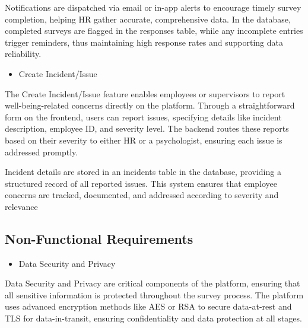 \documentclass[conference]{IEEEtran}
\begin{document}
            Notifications are dispatched via email or in-app 
            alerts to encourage timely survey completion, helping HR gather 
            accurate, comprehensive data. In the database, completed surveys 
            are flagged in the responses table, while any incomplete entries
            trigger reminders, thus maintaining high response rates and 
            supporting data reliability.
            \newline    

            \begin{itemize}
                \item Create Incident/Issue
            \end{itemize}
    
            The Create Incident/Issue feature enables employees or supervisors 
            to report well-being-related concerns directly on the platform. 
            Through a straightforward form on the frontend, users can report 
            issues, specifying details like incident description, employee ID, 
            and severity level. The backend routes these reports based on their 
            severity to either HR or a psychologist, ensuring each issue is 
            addressed promptly. \newline
            
            Incident details are stored in an incidents
            table in the database, providing a structured record of all 
            reported issues. This system ensures that employee concerns are 
            tracked, documented, and addressed according to severity and 
            relevance
            \newline  
    
        \subsection {Non-Functional Requirements}
   
        \begin{itemize}
            \item Data Security and Privacy
        \end{itemize}
    
        Data Security and Privacy are critical components of the platform, 
        ensuring that all sensitive information is protected throughout the 
        survey process. The platform uses advanced encryption methods like 
        AES or RSA to secure data-at-rest and TLS for data-in-transit, 
        ensuring confidentiality and data protection at all stages. 
        \newline
    
\end{document}
